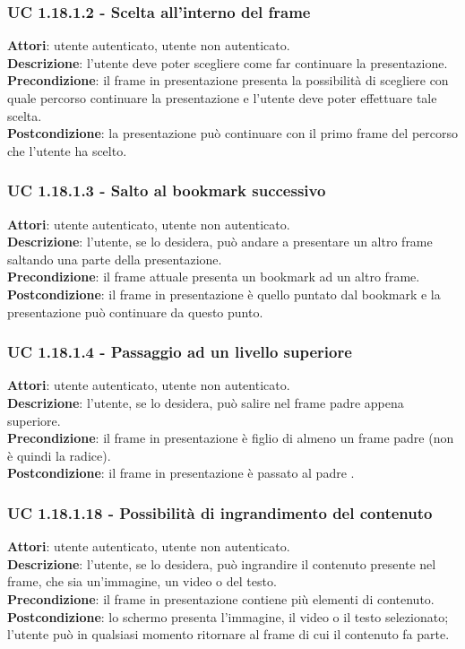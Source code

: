 	\subsubsection{UC 1.18.1.2 - Scelta all'interno del frame}{
		\label{uc1.18.1.2}
		\textbf{Attori}: utente autenticato, utente non autenticato. \\
		\textbf{Descrizione}: l'utente deve poter scegliere come far continuare la presentazione. \\
		\textbf{Precondizione}: il frame in presentazione presenta la possibilità di scegliere con quale percorso continuare la presentazione e l'utente deve poter effettuare tale scelta.	\\
		\textbf{Postcondizione}: la presentazione può continuare con il primo frame del percorso che l'utente ha scelto.
	}
	\subsubsection{UC 1.18.1.3 - Salto al bookmark successivo}{
		\label{uc1.18.1.3}
		\textbf{Attori}: utente autenticato, utente non autenticato. \\
		\textbf{Descrizione}: l'utente, se lo desidera, può andare a presentare un altro frame saltando una parte della presentazione. \\
		\textbf{Precondizione}: il frame attuale presenta un bookmark ad un altro frame.	\\
		\textbf{Postcondizione}: il frame in presentazione è quello puntato dal bookmark e la presentazione può continuare da questo punto.	
	}
	\subsubsection{UC 1.18.1.4 - Passaggio ad un livello superiore}{
		\label{uc1.18.1.4}
		\textbf{Attori}: utente autenticato, utente non autenticato. \\
		\textbf{Descrizione}: l'utente, se lo desidera, può salire nel frame padre appena superiore. \\
		\textbf{Precondizione}: il frame in presentazione è figlio di almeno un frame padre (non è quindi la radice).	\\
		\textbf{Postcondizione}: il frame in presentazione è passato al padre .	
	}
	\subsubsection{UC 1.18.1.18 - Possibilità di ingrandimento del contenuto}{
		\label{uc1.18.1.18}
		\textbf{Attori}: utente autenticato, utente non autenticato. \\
		\textbf{Descrizione}: l'utente, se lo desidera, può ingrandire il contenuto presente nel frame, che sia un'immagine, un video o del testo. \\
		\textbf{Precondizione}: il frame in presentazione contiene più elementi di contenuto.	\\
		\textbf{Postcondizione}: lo schermo presenta l'immagine, il video o il testo selezionato; l'utente può in qualsiasi momento ritornare al frame di cui il contenuto fa parte.	
	}
